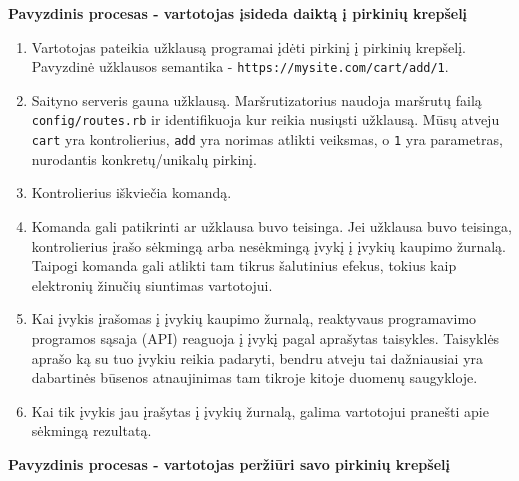 \textbf{Pavyzdinis procesas - vartotojas įsideda daiktą į pirkinių krepšelį}

\begin{enumerate}
  \item Vartotojas pateikia užklausą programai įdėti pirkinį į pirkinių krepšelį. Pavyzdinė užklausos semantika - \lstinline|https://mysite.com/cart/add/1|.

  \item Saityno serveris gauna užklausą. Maršrutizatorius naudoja maršrutų failą \lstinline|config/routes.rb| ir identifikuoja kur reikia nusiųsti užklausą. Mūsų atveju \lstinline|cart| yra kontrolierius, \lstinline|add| yra norimas atlikti veiksmas, o \lstinline|1| yra parametras, nurodantis konkretų/unikalų pirkinį.

  \item Kontrolierius iškviečia komandą.

  \item Komanda gali patikrinti ar užklausa buvo teisinga. Jei užklausa buvo teisinga, kontrolierius įrašo sėkmingą arba nesėkmingą įvykį į įvykių kaupimo žurnalą. Taipogi komanda gali atlikti tam tikrus šalutinius efekus, tokius kaip elektronių žinučių siuntimas vartotojui.

  \item Kai įvykis įrašomas į įvykių kaupimo žurnalą, reaktyvaus programavimo programos sąsaja (API) reaguoja į įvykį pagal aprašytas taisykles. Taisyklės aprašo ką su tuo įvykiu reikia padaryti, bendru atveju tai dažniausiai yra dabartinės būsenos atnaujinimas tam tikroje kitoje duomenų saugykloje.

  \item Kai tik įvykis jau įrašytas į įvykių žurnalą, galima vartotojui pranešti apie sėkmingą rezultatą.
\end{enumerate}

\textbf{Pavyzdinis procesas - vartotojas peržiūri savo pirkinių krepšelį}

